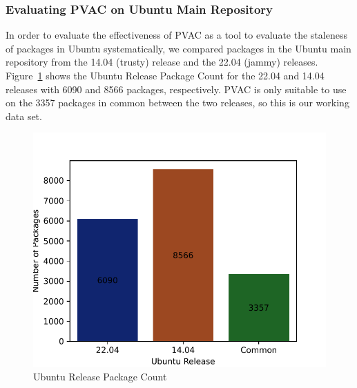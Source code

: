 \documentclass[sn-mathphys-num]{sn-jnl}%
\theoremstyle{thmstyleone}%
\theoremstyle{thmstyletwo}%
\theoremstyle{thmstylethree}%
\begin{document}
\subsubsection{\textbf{Evaluating PVAC on Ubuntu Main Repository}}
In order to evaluate the effectiveness of PVAC as a tool to evaluate the staleness of packages in Ubuntu systematically, we compared packages in the Ubuntu main repository from the 14.04 (trusty) release and the 22.04 (jammy) releases. Figure~\ref{fig:ubuntu-release-package-count} shows the Ubuntu Release Package Count for the 22.04 and 14.04 releases with 6090 and 8566 packages, respectively. PVAC is only suitable to use on the 3357 packages in common between the two releases, so this is our working data set.

\begin{figure}
    \centering
    \includegraphics[width=1.0\linewidth]{figures/ubuntu-release-package-count.pdf}
    \caption{Ubuntu Release Package Count}
    \label{fig:ubuntu-release-package-count}
\end{figure}
\end{document}
